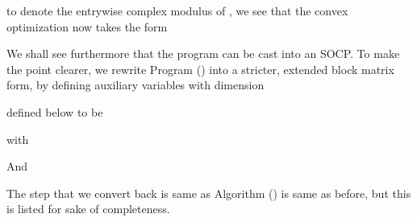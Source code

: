 to denote the entrywise complex modulus of , we see that the convex optimization now takes the form

\stopsection

\startsection [title={Second Order Cone Programming}]

We shall see furthermore that the program can be cast into an SOCP.
To make the point clearer, we rewrite Program () into a stricter, extended block matrix form, by defining auxiliary variables with dimension


defined below to be


with


And


The step that we convert  back is same as Algorithm () is same as before, but this is listed for sake of completeness.


